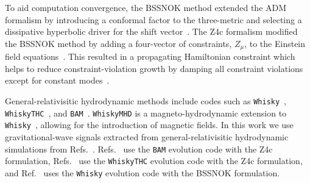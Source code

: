 \documentclass[../Thesis.tex]{subfiles}
\begin{document}
    To aid computation convergence, the BSSNOK method extended the ADM formalism by introducing a conformal factor to the three-metric and selecting a dissipative hyperbolic driver for the  shift vector~\cite{Nakamura1987,Shibata1995,Nakamura1999,Shibata1999,Baumgarte1999,Alcubierre2000,Alcubierre2001}. %
    The Z4c formalism modified the BSSNOK method by adding a four-vector of constraints, $Z_\mu$, to the Einstein field equations~\cite{Bona2003,Bona2004,Gundlach2005,Bernuzzi2010,Hilditch2013}. 
    This resulted in a propagating Hamiltonian constraint which helps to reduce constraint-violation growth by damping all constraint violations  except for constant modes~\cite{Gundlach2005}.
     \par
    

    
    General-relativisitic hydrodynamic methods include codes such as \texttt{Whisky}~\cite{Baiotti2005}, \texttt{WhiskyTHC}~\cite{Baiotti2005,Radice2014,Radice2014b,Radice2015}, and \texttt{BAM}~\cite{Brugmann2004,Brugmann2008,Thierfelder2011,Dietrich2015,Bernuzzi2016b,Dietrich2019a}. 
    \texttt{WhiskyMHD} is a magneto-hydrodynamic extension to \texttt{Whisky}~\cite{Giacomazzo2007,Giacomazzo2011,Giacomazzo2013}, allowing for the introduction of magnetic fields.
    In this work we use gravitational-wave signals extracted from general-relativisitic hydrodynamic simulations from Refs.~\cite{Bernuzzi2014,Rezzolla2016,Radice2016,Dietrich2017b,Radice2017,Radice2017a,Radice2018,Dietrich2018}. 
    Refs.~\cite{Bernuzzi2014,Dietrich2017b} use the \texttt{BAM}  evolution code with the Z4c formulation, Refs.~\cite{Radice2016,Radice2017,Radice2017a,Radice2018} use the \texttt{WhiskyTHC} evolution code with the Z4c formulation, and Ref.~\cite{Rezzolla2016} uses the \texttt{Whisky} evolution code with the BSSNOK formulation. \par 
\end{document}
